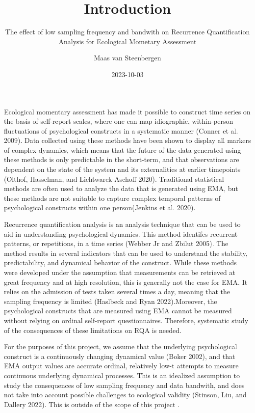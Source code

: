 \documentclass[
  letterpaper,
  DIV=11,
  numbers=noendperiod]{scrartcl}
\title{Introduction}
\subtitle{The effect of low sampling frequency and bandwith on
Recurrence Quantification Analysis for Ecological Mometary Assessment}
\author{Maas van Steenbergen}
\date{2023-10-03}
\begin{document}
\maketitle
\ifdefined\Shaded\renewenvironment{Shaded}{\begin{tcolorbox}[sharp corners, boxrule=0pt, enhanced, borderline west={3pt}{0pt}{shadecolor}, frame hidden, interior hidden, breakable]}{\end{tcolorbox}}\fi

Ecological momentary assessment has made it possible to construct time
series on the basis of self-report scales, where one can map
idiographic, within-person fluctuations of psychological constructs in a
systematic manner (Conner et al. 2009). Data collected using these
methods have been shown to display all markers of complex dynamics,
which means that the future of the data generated using these methods is
only predictable in the short-term, and that observations are dependent
on the state of the system and its externalities at earlier timepoints
(Olthof, Hasselman, and Lichtwarck-Aschoff 2020). Traditional
statistical methods are often used to analyze the data that is generated
using EMA, but these methods are not suitable to capture complex
temporal patterns of psychological constructs within one person(Jenkins
et al. 2020).

Recurrence quantification analysis is an analysis technique that can be
used to aid in understanding psychological dynamics. This method
identifes recurrent patterns, or repetitions, in a time series (Webber
Jr and Zbilut 2005). The method results in several indicators that can
be used to understand the stability, predictability, and dynamical
behavior of the construct. While these methods were developed under the
assumption that measurements can be retrieved at great frequency and at
high resolution, this is generally not the case for EMA. It relies on
the admission of tests taken several times a day, meaning that the
sampling frequency is limited (Haslbeck and Ryan 2022).Moreover, the
psychological constructs that are measured using EMA cannot be measured
without relying on ordinal self-report questionnaires. Therefore,
systematic study of the consequences of these limitations on RQA is
needed.

For the purposes of this project, we assume that the underlying
psychological construct is a continuously changing dynamical value
(Boker 2002), and that EMA output values are accurate ordinal,
relatively low-t attempts to measure continuous underlying dynamical
processes. This is an idealized assumption to study the consequences of
low sampling frequency and data bandwith, and does not take into account
possible challenges to ecological validity (Stinson, Liu, and Dallery
2022). This is outside of the scope of this project .
\end{document}
